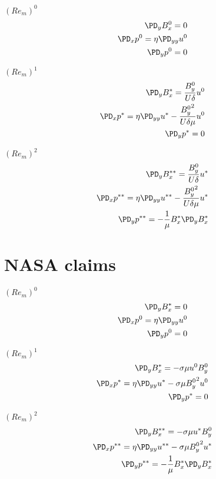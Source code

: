 \documentclass[11pt]{article}
\begin{document}
$(Re_m)^0$
\begin{equation}\begin{aligned}
\PD_{y} B_x^0 = 0 \\
\PD_x p^0 = \eta \PD_{yy} u^0 \\
\PD_y p^0 = 0 \\
\end{aligned} \end{equation}

$(Re_m)^1$
\begin{equation}\begin{aligned}
\PD_{y} B_x^* = \frac{B_y^0}{U \delta} u^0 \\
\PD_x p^* =   \eta \PD_{yy} u^* - \frac{{B_y^0}^2}{U \delta \mu} u^0 \\
\PD_y p^* = 0 \\
\end{aligned} \end{equation}

$(Re_m)^2$
\begin{equation}\begin{aligned}
\PD_y B_x^{**} = \frac{B_y^0}{U \delta} u^* \\
\PD_x p^{**} = \eta \PD_{yy} u^{**} - \frac{{B_y^0}^2}{U \delta \mu} u^* \\
\PD_y p^{**} = - \frac{1}{\mu} B_x^* \PD_y B_x^* \\
\end{aligned} \end{equation}


\section{NASA claims}
$(Re_m)^0$
\begin{equation}\begin{aligned}
\PD_{y} B_x^* = 0 \\
\PD_x p^0 = \eta \PD_{yy} u^0 \\
\PD_y p^0 = 0 \\
\end{aligned} \end{equation}

$(Re_m)^1$
\begin{equation}\begin{aligned}
\PD_{y} B_x^* = -\sigma \mu u^0 B_y^0 \\
\PD_x p^* = \eta \PD_{yy} u^* - \sigma \mu {B_y^0}^2 u^0 \\
\PD_y p^* = 0 \\
\end{aligned} \end{equation}

$(Re_m)^2$
\begin{equation}\begin{aligned}
\PD_{y} B_x^{**} = -\sigma \mu u^* B_y^0 \\
\PD_x p^{**} = \eta \PD_{yy} u^{**} - \sigma \mu {B_y^0}^2 u^* \\
\PD_y p^{**} = - \frac{1}{\mu} B_x^* \PD_y B_x^* \\
\end{aligned} \end{equation}
\end{document}
